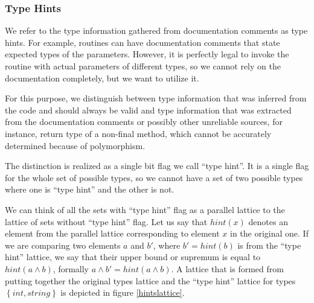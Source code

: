         \subsubsection*{Type Hints}        
        We refer to the type information gathered from documentation 
        comments as type hints. For example, routines can have 
        documentation comments that state expected types of the 
        parameters. However, it is perfectly legal to invoke the 
        routine with actual parameters of different types, so we 
        cannot rely on the documentation completely, but we want 
        to utilize it.
        
        For this purpose, we distinguish between type information 
        that was inferred from the code and should always be 
        valid and type information that was extracted from the 
        documentation comments or possibly other unreliable 
        sources, for instance, return type of a non-final method, 
        which cannot be accurately determined because of 
        polymorphism.
        
        The distinction is realized as a single bit flag 
        we call ``type hint''. It is a single flag for the 
        whole set of possible types, so we cannot have a 
        set of two possible types where one is ``type hint'' 
        and the other is not. 
        
        We can think of all the sets with ``type hint'' flag 
        as a parallel lattice to the lattice of sets without 
        ``type hint'' flag. Let us say that $hint(x)$ denotes 
        an element from the parallel lattice corresponding to 
        element $x$ in the original one. If we are comparing 
        two elements $a$ and $b'$, where $b'=hint(b)$ is from the 
        ``type hint'' lattice, we say that their upper bound or 
        supremum is equal to $hint(a\wedge{}b)$, formally 
        $a\wedge{}b'=hint(a\wedge{}b)$. A lattice that is formed 
        from putting together the original types lattice and the 
        ``type hint'' lattice for types $\left\{int, string\right\}$ 
        is depicted in figure \ref{hintslattice}.
        
